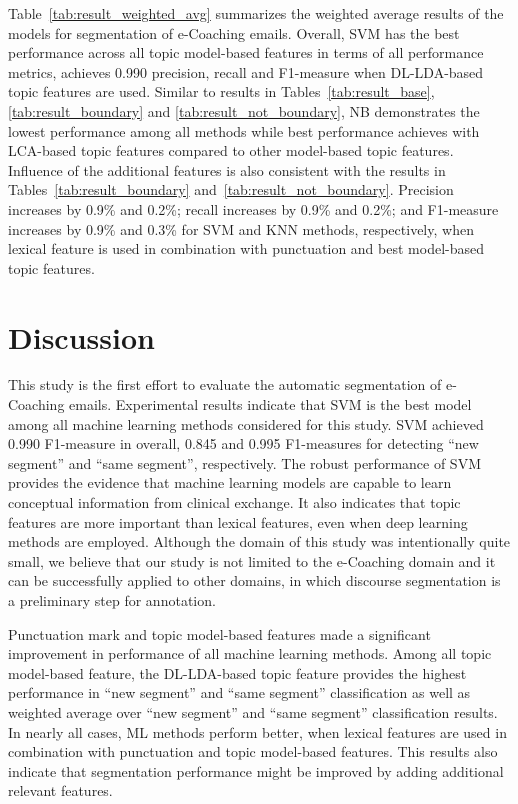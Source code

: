 \documentclass{amia}
\begin{document}
Table~\ref{tab:result_weighted_avg} summarizes the weighted average results of the models for segmentation of e-Coaching emails. Overall, SVM has the best performance across all topic model-based features in terms of all performance metrics, achieves 0.990 precision, recall and F1-measure when DL-LDA-based topic features are used. Similar to results in Tables~\ref{tab:result_base}, \ref{tab:result_boundary} and \ref{tab:result_not_boundary}, NB demonstrates the lowest performance among all methods while best performance achieves with LCA-based topic features compared to other model-based topic features. Influence of the additional features is also consistent with the results in Tables~\ref{tab:result_boundary} and~\ref{tab:result_not_boundary}. Precision increases by 0.9\% and 0.2\%; recall increases by 0.9\% and 0.2\%; and F1-measure increases by 0.9\% and 0.3\% for SVM and KNN methods, respectively, when lexical feature is used in combination with punctuation and best model-based topic features.\\

\section*{Discussion}
This study is the first effort to evaluate the automatic segmentation of e-Coaching emails. Experimental results indicate that SVM is the best model among all machine learning methods considered for this study. SVM achieved 0.990 F1-measure in overall, 0.845 and 0.995 F1-measures for detecting ``new segment'' and ``same segment'', respectively. The robust performance of SVM provides the evidence that machine learning models are capable to learn conceptual information from clinical exchange. It also indicates that topic features are more important than lexical features, even when deep learning methods are employed. Although the domain of this study was intentionally quite small, we believe that our study is not limited to the e-Coaching domain and it can be successfully applied to other domains, in which discourse segmentation is a preliminary step for annotation.

Punctuation mark and topic model-based features made a significant improvement in performance of all machine learning methods. Among all topic model-based feature, the DL-LDA-based topic feature provides the highest performance in ``new segment'' and ``same segment'' classification as well as weighted average over ``new segment'' and ``same segment'' classification results. In nearly all cases, ML methods perform better, when lexical features are used in combination with punctuation and topic model-based features. This results also indicate that segmentation performance might be improved by adding additional relevant features.         
\end{document}
